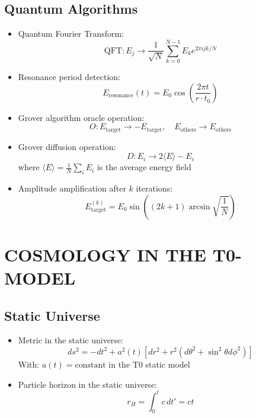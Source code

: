 \documentclass[12pt,a4paper]{article}
\begin{document}
	\subsection{Quantum Algorithms}
	\begin{itemize}
		\item Quantum Fourier Transform:
		$$\text{QFT}: E_j \rightarrow \frac{1}{\sqrt{N}} \sum_{k=0}^{N-1} E_k e^{2\pi i jk/N}$$
		
		\item Resonance period detection:
		$$E_{\text{resonance}}(t) = E_0 \cos\left(\frac{2\pi t}{r \cdot t_0}\right)$$
		
		\item Grover algorithm oracle operation:
		$$O: E_{\text{target}} \rightarrow -E_{\text{target}}, \quad E_{\text{others}} \rightarrow E_{\text{others}}$$
		
		\item Grover diffusion operation:
		$$D: E_i \rightarrow 2\langle E \rangle - E_i$$
		where $\langle E \rangle = \frac{1}{N}\sum_i E_i$ is the average energy field
		
		\item Amplitude amplification after $k$ iterations:
		$$E_{\text{target}}^{(k)} = E_0 \sin\left((2k+1)\arcsin\sqrt{\frac{1}{N}}\right)$$
	\end{itemize}
	
	\section{COSMOLOGY IN THE T0-MODEL}
	
	\subsection{Static Universe}
	\begin{itemize}
		\item Metric in the static universe:
		$$ds^2 = -dt^2 + a^2(t)[dr^2 + r^2(d\theta^2 + \sin^2\theta d\phi^2)]$$
		With: $a(t) = \text{constant}$ in the T0 static model
		
		\item Particle horizon in the static universe:
		$$r_H = \int_0^t c \, dt' = ct$$
	\end{itemize}
	
\end{document}
